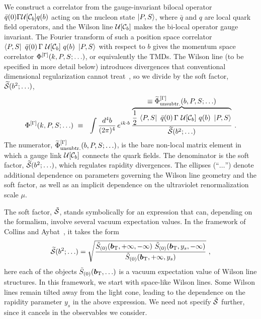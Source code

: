 We construct a correlator from the gauge-invariant bilocal operator $\bar q(0) \Gamma {\mathcal{U}}{[\mathcal{C}_b]} q(b)$ acting on the nucleon state $\ket{P, S}$, where $\bar q$ and $q$ are local quark field operators, and the Wilson line ${\mathcal{U}}{[\mathcal{C}_b]}$ makes the bi-local operator gauge invariant. The Fourier transform of such a position space correlator $\bra{P,S}\ \bar{q}(0)\, \Gamma\ \WlineC{\mathcal{C}_\bvec}\ q(\bvec)\ \ket{P,S}$ with respect to $b$ gives the momentum space correlator $\Phi^{[\Gamma]}(k,P,S;\ldots)$, or equivalently the TMDs. The Wilson
line (to be specified in more detail below) introduces divergences that conventional dimensional
regularization cannot treat~\cite{Musch:2011er}, so we divide by the soft factor, $\widetilde{\mathcal{S}}(b^2;\ldots)$, 
\begin{align}
	\Phi^{[\Gamma]}(\kei,P,S;\ldots)\ \equiv\ \ 
	\int \frac{d^4 \bvec}{(2\pi)^4}\, e^{i \kei\cdot \bvec}\,
		\frac{\overbrace{\rule{0em}{1.2em}
		\frac{1}{2}\, \bra{P,S}\ \bar{q}(0)\, \Gamma\ \WlineC{\mathcal{C}_\bvec}\ q(\bvec)\ \ket{P,S}
		}^{\displaystyle \equiv \widetilde \Phi_\unsub^{[\Gamma]}(\bvec,P,S;\ldots)}}
		{ \widetilde{\softf}(\bvec^2;\ldots) } \ .
		\label{eq-corr}	
\end{align}
The numerator, $\widetilde \Phi_{\text{unsubtr.}}^{[\Gamma]}(b, P,S;\ldots)$, is the bare non-local matrix element in which a gauge link ${\mathcal{U}}{[\mathcal{C}_b]}$ connects the quark fields. The denominator is the soft factor, $\widetilde{\mathcal{S}}(b^2;\ldots)$, which regulates rapidity divergences. The ellipses (``$\ldots$'') denote additional dependence on parameters governing the Wilson line geometry and the soft factor, as well as an implicit dependence on the ultraviolet renormalization scale $\mu$.

The soft factor, $\tilde {\mathcal{S}}$, stands symbolically for an
expression that can, depending on the formalism, involve several vacuum
expectation values. In the framework of Collins and Aybat~\cite{Aybat:2011zv,CollinsBook2011,Aybat:2011ge}, it takes the form
\begin{equation}
\widetilde{\mathcal{S}}(b^2;\ldots) = 
  \sqrt{ \frac
    { \tilde S_{(0)}( \boldsymbol{b}_{\mathrm T}, + \infty, -\infty )\ \tilde S_{(0)}( \boldsymbol{b}_{\mathrm T}, y_s, -\infty ) }
    { \tilde S_{(0)}( \boldsymbol{b}_{\mathrm T}, + \infty, y_s ) }
  } \ ,
\end{equation}
here each of the objects $\tilde S_{(0)}( \boldsymbol{b}_{\mathrm T}, \ldots )$ is a
vacuum expectation value of Wilson line structures.
In this framework, we start with space-like Wilson lines. Some Wilson lines remain tilted away from the light cone, leading to the dependence on the rapidity parameter $y_s$ in the above expression. We need not specify $\tilde {\mathcal{S}}$ further, since it cancels in the observables we consider.

